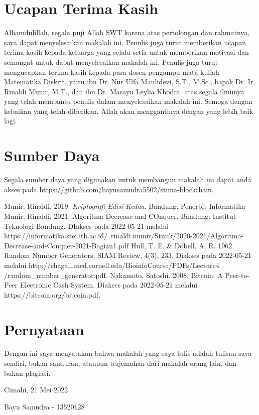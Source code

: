\documentclass[10pt,conference]{IEEEtran}
\theoremstyle{definition}
\begin{document}
\section*{Ucapan Terima Kasih}
Alhamdulillah, segala puji Allah SWT karena atas pertolongan dan rahmatnya, saya dapat menyelesaikan makalah ini. Penulis juga turut memberikan ucapan terima kasih kepada keluarga yang selalu setia untuk
memberikan motivasi dan semangat untuk dapat menyelesaikan makalah ini. Penulis juga turut mengucapkan terima kasih kepada para dosen pengampu mata kuliah Matematika Diskrit, yaitu ibu Dr. Nur Ulfa Maulidevi, S.T., M.Sc., bapak Dr. Ir.
Rinaldi Munir, M.T., dan ibu Dr. Masayu Leylia Khodra. atas segala ilmunya yang telah membantu penulis dalam menyelesaikan makalah ini. Semoga dengan kebaikan yang telah diberikan, Allah akan menggantinya dengan yang lebih baik lagi.

\section*{Sumber Daya}
Segala sumber daya yang digunakan untuk membangun makalah ini dapat anda akses pada \url{https://github.com/bayusamudra5502/stima-blockchain}.


\begin{thebibliography}{00}
 Munir, Rinaldi. 2019. \emph{Kriptografi Edisi Kedua}. Bandung: Penerbit Informatika 
 Munir, Rinaldi. 2021. Algoritma Decrease and COnquer. Bandung: Institut Teknologi Bandung. DIakses pada 2022-05-21 melalui https://informatika.stei.itb.ac.id/~rinaldi.munir/Stmik/2020-2021/Algoritma-Decrease-and-Conquer-2021-Bagian1.pdf
 Hull, T. E. \& Dobell, A. R. 1962. Random Number Generators. SIAM Review, 4(3), 233. Diakses pada 2022-05-21 melalui http://chagall.med.cornell.edu/BioinfoCourse/PDFs/Lecture4\\
/random\_number\_generator.pdf.
 Nakamoto, Satoshi. 2008. Bitcoin: A Peer-to-Peer Electronic Cash System. Diakses pada 2022-05-21 melalui https://bitcoin.org/bitcoin.pdf.
\end{thebibliography}

\section*{Pernyataan}
Dengan ini saya menyatakan bahwa makalah yang saya tulis adalah tulisan saya sendiri, bukan sanduran, ataupun terjemahan dari makalah orang lain, dan bukan plagiasi.


\vspace{20px}
\hspace*{\fill} Cimahi, 21 Mei 2022

\vspace{50px}
\hspace*{\fill} Bayu Samudra - 13520128
\end{document}
